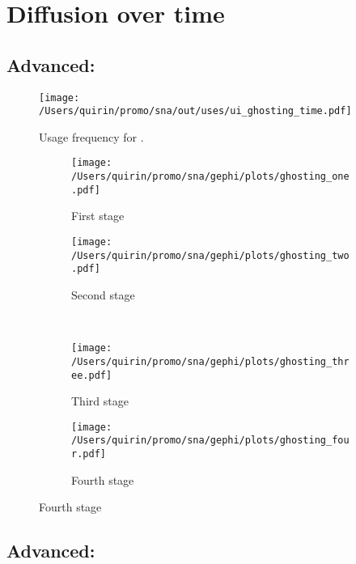 \documentclass[
  a4paper,
  ]{scrartcl}
\begin{document}
\section{Diffusion over time}

  \subsection{Advanced: }

    \begin{figure}[H]
      \caption{Usage frequency for .}
      \centering
      \texttt{[image: /Users/quirin/promo/sna/out/uses/ui\_ghosting\_time.pdf]}
    \end{figure}

    \begin{figure}[H]
      \caption{Social network of diffusion for  over time.}
      \centering
      \begin{subfigure}{.45\linewidth}
        \caption{First stage}
        \centering
        \texttt{[image: /Users/quirin/promo/sna/gephi/plots/ghosting\_one.pdf]}
      \end{subfigure}
      \begin{subfigure}{.45\linewidth}
        \caption{Second stage}
        \centering
        \texttt{[image: /Users/quirin/promo/sna/gephi/plots/ghosting\_two.pdf]}
      \end{subfigure}\\
      \begin{subfigure}{.45\linewidth}
        \caption{Third stage}
        \centering
        \texttt{[image: /Users/quirin/promo/sna/gephi/plots/ghosting\_three.pdf]}
      \end{subfigure}
      \begin{subfigure}{.45\linewidth}
        \caption{Fourth stage}
        \centering
        \texttt{[image: /Users/quirin/promo/sna/gephi/plots/ghosting\_four.pdf]}
      \end{subfigure}
    \end{figure}

  \subsection{Advanced: }
\end{document}
